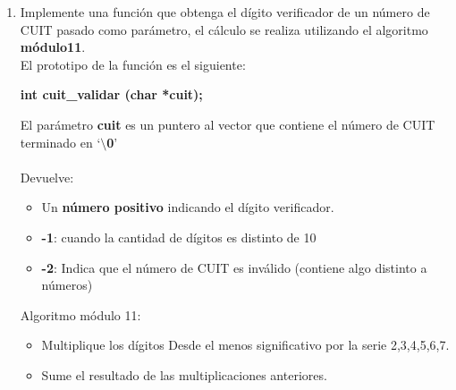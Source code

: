 \documentclass[12pt]{article} %
\begin{document}
\begin{enumerate}
$R_1$ = $C_0$*9 + $C_1$*7 + $C_2$*1 + $C_3$*3 + $C_4$*9 + $C_5$*7 + $C_6$*1 + $C_7$*3 + $C_8$*9 + $C_9$*7 + $C_{10}$*1 + $C_{11}$*3  + $C_{12}$* 9\\
$D_1$ = 10 - ($R_1$ \% 10)\\
\fontsize{12pt}{12pt}\selectfont
\\
La función tiene el siguiente prototipo:
\begin{center}
{\bf int cbu\_validar (char *dataPtr)}
\end{center}
Donde {\bf dataPtr} es el puntero la clave bancaria uniforme a validar terminada en ‘{\bf $\setminus$0}’\\
\\
Devuelve:
\begin{itemize}
\item {\bf -1} Si la CBU pasada no tiene 22 caracteres.
\item {\bf -2} Si alguno de los caracteres de la CBU no es un número.
\item {\bf -3} Si el dígito verificador D0 no corresponde.
\item {\bf -4} Si el dígito verificador D1 no corresponde.
\end{itemize}
\item Implemente una función que obtenga el dígito verificador de un número de CUIT pasado como 
parámetro, el cálculo se realiza utilizando el algoritmo {\bf módulo11}.\\
 El prototipo de la función es el siguiente:
\begin{center}
{\bf int cuit\_validar (char *cuit);}
\end{center}
El parámetro {\bf cuit} es un puntero al vector que contiene el número de CUIT terminado en ‘{\bf $\setminus$0}’\\
\\
Devuelve:
\begin{itemize}
\item Un {\bf número positivo} indicando el dígito verificador. 
\item {\bf -1}: cuando la cantidad de dígitos es distinto de 10 
\item {\bf -2}: Indica que el número de CUIT es inválido (contiene algo distinto a números) \end{itemize}
Algoritmo módulo 11:  
\begin{itemize}
\item Multiplique los dígitos Desde el menos significativo por la serie 2,3,4,5,6,7.
\item Sume el resultado de las multiplicaciones anteriores.

\end{itemize}
\end{enumerate}
\end{document}
